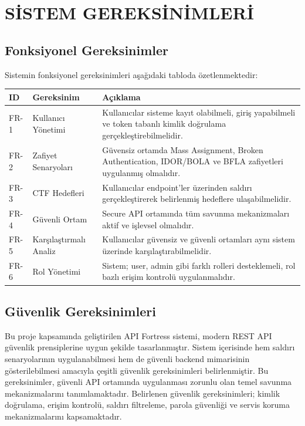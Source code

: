 \section{SİSTEM GEREKSİNİMLERİ}
\label{bolum4}

\subsection{Fonksiyonel Gereksinimler}
\label{fonksiyonel-gereksinimler}

Sistemin fonksiyonel gereksinimleri aşağıdaki tabloda özetlenmektedir:

\begin{table}[H]
\centering
\begin{tabular}{|L{3.5cm}|L{3.5cm}|L{3.5cm}|}
\hline
\textbf{ID} & \textbf{Gereksinim} & \textbf{Açıklama} \\
\hline
FR-1 & Kullanıcı Yönetimi & Kullanıcılar sisteme kayıt olabilmeli, giriş yapabilmeli ve token tabanlı kimlik doğrulama gerçekleştirebilmelidir. \\
\hline
FR-2 & Zafiyet Senaryoları & Güvensiz ortamda Mass Assignment, Broken Authentication, IDOR/BOLA ve BFLA zafiyetleri uygulanmış olmalıdır. \\
\hline
FR-3 & CTF Hedefleri & Kullanıcılar endpoint'ler üzerinden saldırı gerçekleştirerek belirlenmiş hedeflere ulaşabilmelidir. \\
\hline
FR-4 & Güvenli Ortam & Secure API ortamında tüm savunma mekanizmaları aktif ve işlevsel olmalıdır. \\
\hline
FR-5 & Karşılaştırmalı Analiz & Kullanıcılar güvensiz ve güvenli ortamları aynı sistem üzerinde karşılaştırabilmelidir. \\
\hline
FR-6 & Rol Yönetimi & Sistem; user, admin gibi farklı rolleri desteklemeli, rol bazlı erişim kontrolü uygulanmalıdır. \\
\hline
\end{tabular}
\end{table}

\subsection{Güvenlik Gereksinimleri}
\label{g-venlik-gereksinimleri}

Bu proje kapsamında geliştirilen API Fortress sistemi, modern REST API güvenlik prensiplerine uygun şekilde tasarlanmıştır. Sistem içerisinde hem saldırı senaryolarının uygulanabilmesi hem de güvenli backend mimarisinin gösterilebilmesi amacıyla çeşitli güvenlik gereksinimleri belirlenmiştir. Bu gereksinimler, güvenli API ortamında uygulanması zorunlu olan temel savunma mekanizmalarını tanımlamaktadır. Belirlenen güvenlik gereksinimleri; kimlik doğrulama, erişim kontrolü, saldırı filtreleme, parola güvenliği ve servis koruma mekanizmalarını kapsamaktadır.

